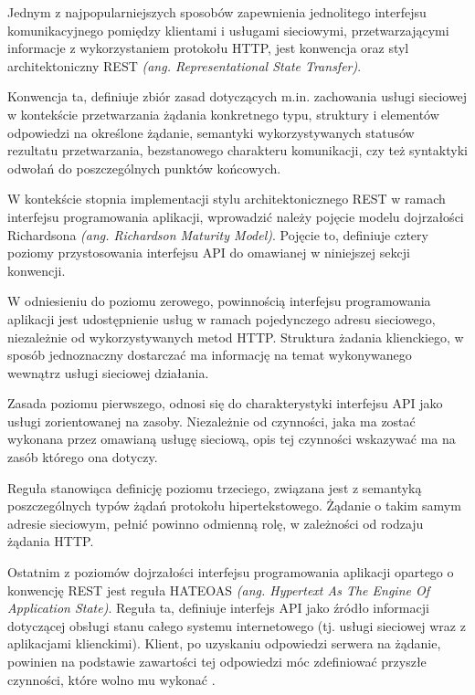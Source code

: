 Jednym z najpopularniejszych sposobów zapewnienia jednolitego interfejsu komunikacyjnego pomiędzy klientami i usługami sieciowymi, przetwarzającymi informacje z wykorzystaniem protokołu HTTP, jest konwencja oraz styl architektoniczny REST \textit{(ang. Representational State Transfer)}.

Konwencja ta, definiuje zbiór zasad dotyczących m.in. zachowania usługi sieciowej w kontekście przetwarzania żądania konkretnego typu, struktury i elementów odpowiedzi na określone żądanie, semantyki wykorzystywanych statusów rezultatu przetwarzania, bezstanowego charakteru komunikacji, czy też syntaktyki odwołań do poszczególnych punktów końcowych.

W kontekście stopnia implementacji stylu architektonicznego REST w ramach interfejsu programowania aplikacji, wprowadzić należy pojęcie modelu dojrzałości Richardsona \textit{(ang. Richardson Maturity Model)}. Pojęcie to, definiuje cztery poziomy przystosowania interfejsu API do omawianej w niniejszej sekcji konwencji.

W odniesieniu do poziomu zerowego, powinnością interfejsu programowania aplikacji jest udostępnienie usług w ramach pojedynczego adresu sieciowego, niezależnie od wykorzystywanych metod HTTP. Struktura żadania klienckiego, w sposób jednoznaczny dostarczać ma informację na temat wykonywanego wewnątrz usługi sieciowej działania.

Zasada poziomu pierwszego, odnosi się do charakterystyki interfejsu API jako usługi zorientowanej na zasoby. Niezależnie od czynności, jaka ma zostać wykonana przez omawianą usługę sieciową, opis tej czynności wskazywać ma na zasób którego ona dotyczy.

Reguła stanowiąca definicję poziomu trzeciego, związana jest z semantyką poszczególnych typów żądań protokołu hipertekstowego. Żądanie o takim samym adresie sieciowym, pełnić powinno odmienną rolę, w zależności od rodzaju żądania HTTP.

Ostatnim z poziomów dojrzałości interfejsu programowania aplikacji opartego o konwencję REST jest reguła HATEOAS \textit{(ang. Hypertext As The Engine Of Application State)}. Reguła ta, definiuje interfejs API jako źródło informacji dotyczącej obsługi stanu całego systemu internetowego (tj. usługi sieciowej wraz z aplikacjami klienckimi). Klient, po uzyskaniu odpowiedzi serwera na żądanie, powinien na podstawie zawartości tej odpowiedzi móc zdefiniować przyszłe czynności, które wolno mu wykonać \cite{webber2010rest}.  

